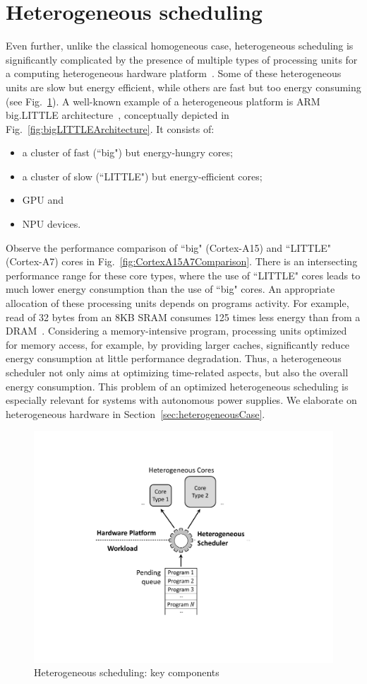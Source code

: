 \section{Heterogeneous scheduling}
Even further, unlike the classical homogeneous case, heterogeneous scheduling is significantly complicated by the presence of multiple types of processing units for a computing heterogeneous hardware platform~\cite{Radulescu2000}. Some of these heterogeneous units are slow but energy efficient, while others are fast but too energy consuming (see Fig.~\ref{fig:heteroExampleOverview}). A well-known example of a heterogeneous platform is ARM big.LITTLE architecture~\cite{Padoin2015}, conceptually depicted in Fig.~\ref{fig:bigLITTLEArchitecture}. It consists of:
%
\begin{itemize}
\item a cluster of fast (``big") but energy-hungry cores;
\item a cluster of slow (``LITTLE") but energy-efficient  cores;
\item GPU and
\item NPU devices.
\end{itemize}
%
Observe the performance comparison of ``big" (Cortex-A15) and ``LITTLE" (Cortex-A7) cores in Fig.~\ref{fig:CortexA15A7Comparison}. There is an intersecting performance range for these core types, where the use of ``LITTLE" cores leads to much lower energy consumption than the use of ``big" cores.
An appropriate allocation of these processing units depends on programs activity. For example, read of 32 bytes from an 8KB SRAM consumes 125 times less energy than from a DRAM~\cite{Hennessy2017}.
Considering a memory-intensive program, processing units optimized for memory access, for example, by providing larger caches, significantly reduce energy consumption at little performance degradation. Thus, a heterogeneous scheduler not only aims at optimizing time-related aspects, but also the overall energy consumption. This problem of an optimized heterogeneous scheduling is especially relevant for systems with autonomous power supplies. We elaborate on heterogeneous hardware in Section~\ref{sec:heterogeneousCase}.

\begin{figure}
\centering
\includegraphics[width=0.5\columnwidth]{figs/heteroExampleOverview.pdf}
\caption{Heterogeneous scheduling: key components}
\label{fig:heteroExampleOverview}
\end{figure}

